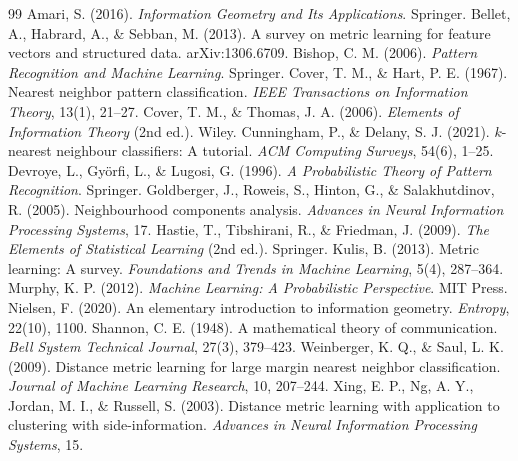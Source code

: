\documentclass[11pt]{article}
\begin{document}
\begin{thebibliography}{99}
 Amari, S. (2016). \emph{Information Geometry and Its Applications}. Springer.
 Bellet, A., Habrard, A., \& Sebban, M. (2013). A survey on metric learning for feature vectors and structured data. arXiv:1306.6709.
 Bishop, C. M. (2006). \emph{Pattern Recognition and Machine Learning}. Springer.
 Cover, T. M., \& Hart, P. E. (1967). Nearest neighbor pattern classification. \emph{IEEE Transactions on Information Theory}, 13(1), 21--27.
 Cover, T. M., \& Thomas, J. A. (2006). \emph{Elements of Information Theory} (2nd ed.). Wiley.
 Cunningham, P., \& Delany, S. J. (2021). $k$-nearest neighbour classifiers: A tutorial. \emph{ACM Computing Surveys}, 54(6), 1--25.
 Devroye, L., Gy\"orfi, L., \& Lugosi, G. (1996). \emph{A Probabilistic Theory of Pattern Recognition}. Springer.
 Goldberger, J., Roweis, S., Hinton, G., \& Salakhutdinov, R. (2005). Neighbourhood components analysis. \emph{Advances in Neural Information Processing Systems}, 17.
 Hastie, T., Tibshirani, R., \& Friedman, J. (2009). \emph{The Elements of Statistical Learning} (2nd ed.). Springer.
 Kulis, B. (2013). Metric learning: A survey. \emph{Foundations and Trends in Machine Learning}, 5(4), 287--364.
 Murphy, K. P. (2012). \emph{Machine Learning: A Probabilistic Perspective}. MIT Press.
 Nielsen, F. (2020). An elementary introduction to information geometry. \emph{Entropy}, 22(10), 1100.
 Shannon, C. E. (1948). A mathematical theory of communication. \emph{Bell System Technical Journal}, 27(3), 379--423.
 Weinberger, K. Q., \& Saul, L. K. (2009). Distance metric learning for large margin nearest neighbor classification. \emph{Journal of Machine Learning Research}, 10, 207--244.
 Xing, E. P., Ng, A. Y., Jordan, M. I., \& Russell, S. (2003). Distance metric learning with application to clustering with side-information. \emph{Advances in Neural Information Processing Systems}, 15.
\end{thebibliography}
\end{document}
